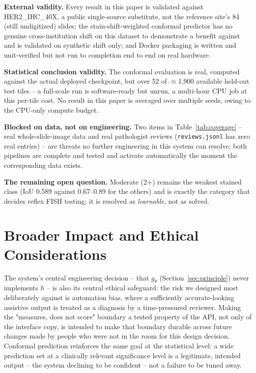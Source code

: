 \documentclass[conference]{IEEEtran}
\begin{document}
\textbf{External validity.} Every result in this paper is validated
against HER2\_IHC\_40X, a public single-source substitute, not the
reference site's 84 (still undigitized) slides; the stain-shift-weighted
conformal predictor has no genuine cross-institution shift on this dataset
to demonstrate a benefit against and is validated on synthetic shift only;
and Docker packaging is written and unit-verified but not run to
completion end to end on real hardware.

\textbf{Statistical conclusion validity.} The conformal evaluation is
real, computed against the actual deployed checkpoint, but over 52 of
$\approx$1{,}900 available held-out test tiles -- a full-scale run is
software-ready but unrun, a multi-hour CPU job at this per-tile cost. No
result in this paper is averaged over multiple seeds, owing to the
CPU-only compute budget.

\textbf{Blocked on data, not on engineering.} Two items in
Table~\ref{tab:coverage} -- real whole-slide-image data and real
pathologist reviews (\texttt{reviews.jsonl} has zero real entries) -- are
threats no further engineering in this system can resolve; both pipelines
are complete and tested and activate automatically the moment the
corresponding data exists.

\textbf{The remaining open question.} Moderate (2+) remains the weakest
stained class (IoU 0.589 against 0.67--0.89 for the others) and is exactly
the category that decides reflex FISH testing; it is resolved as
\emph{learnable}, not as solved.

\section{Broader Impact and Ethical Considerations}

The system's central engineering decision -- that $g_\theta$
(Section~\ref{sec:principle}) never implements $h$ -- is also its central
ethical safeguard: the risk we designed most deliberately against is
automation bias, where a sufficiently accurate-looking assistive output is
treated as a diagnosis by a time-pressured reviewer. Making the "measures,
does not score" boundary a tested property of the API, not only of the
interface copy, is intended to make that boundary durable across future
changes made by people who were not in the room for this design decision.
Conformal prediction reinforces the same goal at the statistical level: a
wide prediction set at a clinically relevant significance level is a
legitimate, intended output -- the system declining to be confident -- not
a failure to be tuned away.
\end{document}

